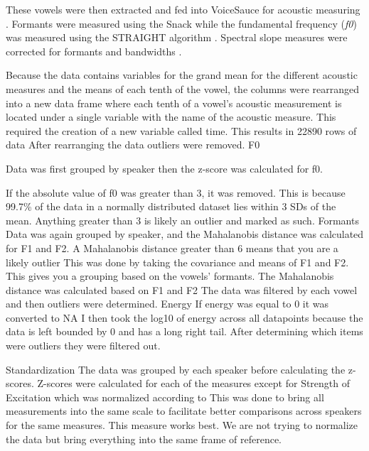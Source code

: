 \documentclass[12pt, letterpaper]{article}
\begin{document}
These vowels were then extracted and fed into VoiceSauce for acoustic measuring \citep{shueVOICESAUCEProgramVoice2009}. Formants were measured using the Snack \citep{sjolanderSnackSoundToolkit2004} while the fundamental frequency (\textit{f0}) was measured using the STRAIGHT algorithm \citep{kawaharaInstantaneousfrequencybasedPitchExtraction1998}. Spectral slope measures were corrected for formants and bandwidths \citep{hansonGlottalCharacteristicsFemale1997,iseliAgeSexVowel2007}.

Because the data contains variables for the grand mean for the different acoustic measures and the means of each tenth of the vowel, the columns were rearranged into a new data frame where each tenth of a vowel’s acoustic measurement is located under a single variable with the name of the acoustic measure. 
This required the creation of a new variable called time. 
This results in 22890 rows of data
After rearranging the data outliers were removed. 
F0

Data was first grouped by speaker then the z-score was calculated for f0. 

If the absolute value of f0 was greater than 3, it was removed. This is because 99.7\% of the data in a normally distributed dataset lies within 3 SDs of the mean. Anything greater than 3 is likely an outlier and marked as such.
Formants
Data was again grouped by speaker, and the Mahalanobis distance \citep{martosGeneralizationMahalanobisDistance2013,
mahalanobisGeneralizedDistanceStatistics2018,drumondUsingMahalanobisDistance2019} was calculated for F1 and F2. 
A Mahalanobis distance greater than 6 means that you are a likely outlier
This was done by taking the covariance and means of F1 and F2. This gives you a grouping based on the vowels’ formants. 
The Mahalanobis distance was calculated based on F1 and F2
The data was filtered by each vowel and then outliers were determined. 
Energy
If energy was equal to 0 it was converted to NA
I then took the log10  of energy across all datapoints because the data is left bounded by 0 and has a long right tail. 
After determining which items were outliers they were filtered out.

Standardization
The data was grouped by each speaker before calculating the z-scores.
Z-scores were calculated for each of the measures except for Strength of Excitation which was normalized according to \citet{garellekVoicingGlottalConsonants2021}
This was done to bring all measurements into the same scale to facilitate better comparisons across speakers for the same measures.
This measure works best. We are not trying to normalize the data but bring everything into the same frame of reference.
\end{document}
